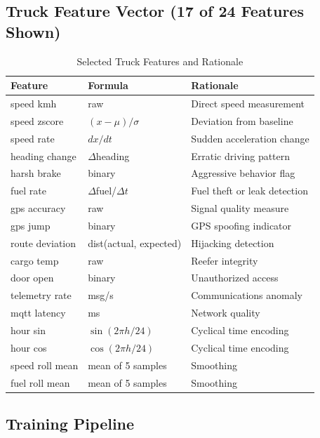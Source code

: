 \documentclass[12pt,a4paper]{amritareport}
\begin{document}
\subsection{Truck Feature Vector (17 of 24 Features Shown)}

\begin{table}[H]
\centering
\caption{Selected Truck Features and Rationale}
\label{tab:truck_features}
\small
\begin{tabular}{@{}P{3.3cm}P{3.7cm}P{5.7cm}@{}}
\toprule
\textbf{Feature} & \textbf{Formula} & \textbf{Rationale} \\
\midrule
speed kmh & raw & Direct speed measurement \\
speed zscore & $(x-\mu)/\sigma$ & Deviation from baseline \\
speed rate & $dx/dt$ & Sudden acceleration change \\
heading change & $\Delta$heading & Erratic driving pattern \\
harsh brake & binary & Aggressive behavior flag \\
fuel rate & $\Delta$fuel/$\Delta t$ & Fuel theft or leak detection \\
gps accuracy & raw & Signal quality measure \\
gps jump & binary & GPS spoofing indicator \\
route deviation & dist(actual, expected) & Hijacking detection \\
cargo temp & raw & Reefer integrity \\
door open & binary & Unauthorized access \\
telemetry rate & msg/s & Communications anomaly \\
mqtt latency & ms & Network quality \\
hour sin & $\sin(2\pi h/24)$ & Cyclical time encoding \\
hour cos & $\cos(2\pi h/24)$ & Cyclical time encoding \\
speed roll mean & mean of 5 samples & Smoothing \\
fuel roll mean & mean of 5 samples & Smoothing \\
\bottomrule
\end{tabular}
\end{table}

\subsection{Training Pipeline}
\end{document}
